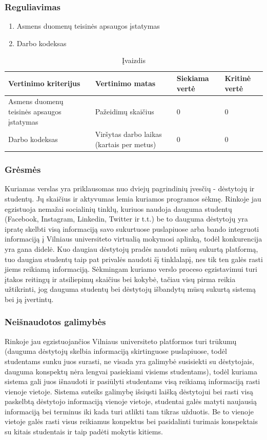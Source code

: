 \documentclass{VUMIFPSkursinis}
\begin{document}
	\subsubsection{Reguliavimas}
\begin{enumerate}
	\item Asmens duomenų teisinės apsaugos įstatymas
	\item Darbo kodeksas
\end{enumerate}
\begin{table}[H]
	\centering
	\caption{Įvaizdis}
	{\begin{tabular}{|p{5cm}|p{}|p{2cm}|p{2cm}|} \hline
			Vertinimo kriterijus & Vertinimo matas & Siekiama vertė & Kritinė vertė \\
			\hline
			Asmens duomenų teisinės apsaugos įstatymas & Pažeidimų skaičius & 0 & 0 \\
			\hline
			Darbo kodeksas & Viršytas darbo laikas (kartais per metus) & 0 & 0 \\
			\hline
	\end{tabular}}
	\label{reguliavimas}
\end{table}
\subsubsection{Grėsmės}
Kuriamas verslas yra priklausomas nuo dviejų pagrindinių įvesčių - dėstytojų ir studentų. Jų skaičius ir aktyvumas lemia kuriamos programos sėkmę. Rinkoje jau egzistuoja nemažai socialinių tinklų, kuriuos naudoja dauguma studentų (Facebook, Instagram, Linkedin, Twitter ir t.t.) be to dauguma dėstytojų yra ipratę skelbti visą informaciją savo sukurtuose puslapiuose arba bando integruoti informaciją į Vilniaus universiteto virtualią mokymosi aplinką, todėl konkurencija yra gana didelė. Kuo daugiau dėstytojų pradės naudoti mūsų sukurtą platformą, tuo daugiau studentų taip pat privalės naudoti šį tinklalapį, nes tik ten galės rasti jiems reikiamą informaciją. Sėkmingam kuriamo verslo proceso egzistavimui turi įtakos reitingų ir atsiliepimų skaičius bei kokybė, tačiau visų pirma reikia užtikrinti, jog dauguma studentų bei dėstytojų išbandytų mūsų sukurtą sistemą bei ją įvertintų.
\subsubsection{Neišnaudotos galimybės}
Rinkoje jau egzistuojančios Vilniaus universiteto platformos turi trūkumų (dauguma dėstytojų skelbia informaciją skirtinguose puslapiuose, todėl studentams sunku juos surasti, ne visada yra galimybė susisiekti su dėstytojais, dauguma konspektų nėra lengvai pasiekiami visiems studentams), todėl kuriama sistema gali juos išnaudoti ir pasiūlyti studentams visą reikiamą informaciją rasti vienoje vietoje. Sistema suteiks galimybę išsiųsti laišką dėstytojui bei rasti visą paskelbtą dėstytojo informaciją vienoje vietoje, studentai galės matyti naujausią informaciją bei terminus iki kada turi atlikti tam tikras užduotis. Be to vienoje vietoje galės rasti visus reikiamus konpektus bei pasidalinti turimais konspektais su kitais studentais ir taip padėti mokytis kitiems.
\newpage
\newpage
\end{document}
